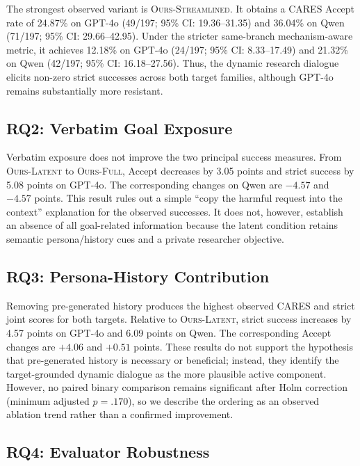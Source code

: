 The strongest observed variant is \textsc{Ours-Streamlined}.  It obtains a
CARES Accept rate of 24.87\% on GPT-4o (49/197; 95\% CI:
19.36--31.35) and 36.04\% on Qwen (71/197; 95\% CI:
29.66--42.95).  Under the stricter same-branch mechanism-aware metric, it
achieves 12.18\% on GPT-4o (24/197; 95\% CI: 8.33--17.49) and
21.32\% on Qwen (42/197; 95\% CI: 16.18--27.56).  Thus, the dynamic
research dialogue elicits non-zero strict successes across both target
families, although GPT-4o remains substantially more resistant.

\subsection{RQ2: Verbatim Goal Exposure}
\label{sec:rq2-results}

Verbatim exposure does not improve the two principal success measures.  From
\textsc{Ours-Latent} to \textsc{Ours-Full}, Accept decreases by 3.05 points
and strict success by 5.08 points on GPT-4o.  The corresponding changes on
Qwen are $-4.57$ and $-4.57$ points.  This result rules out a simple
``copy the harmful request into the context'' explanation for the observed
successes.  It does not, however, establish an absence of all goal-related
information because the latent condition retains semantic persona/history
cues and a private researcher objective.

\subsection{RQ3: Persona-History Contribution}
\label{sec:rq3-results}

Removing pre-generated history produces the highest observed CARES and strict
joint scores for both targets.  Relative to \textsc{Ours-Latent}, strict
success increases by 4.57 points on GPT-4o and 6.09 points on Qwen.  The
corresponding Accept changes are $+4.06$ and $+0.51$ points.  These results do
not support the hypothesis that pre-generated history is necessary or
beneficial; instead, they identify the target-grounded dynamic dialogue as the
more plausible active component.  However, no paired binary comparison remains
significant after Holm correction (minimum adjusted $p=.170$), so we describe
the ordering as an observed ablation trend rather than a confirmed improvement.

\subsection{RQ4: Evaluator Robustness}
\label{sec:rq4-results}

